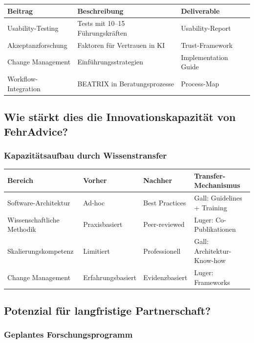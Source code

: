 \documentclass[11pt,a4paper]{article}
\begin{document}
\begin{table}[h]
\centering
\begin{tabularx}{\textwidth}{lXl}
\toprule
\textbf{Beitrag} & \textbf{Beschreibung} & \textbf{Deliverable} \\
\midrule
Usability-Testing & Tests mit 10--15 Führungskräften & Usability-Report \\
Akzeptanzforschung & Faktoren für Vertrauen in KI & Trust-Framework \\
Change Management & Einführungsstrategien & Implementation Guide \\
Workflow-Integration & BEATRIX in Beratungsprozesse & Process-Map \\
\bottomrule
\end{tabularx}
\end{table}

\subsection{Wie stärkt dies die Innovationskapazität von FehrAdvice?}

\subsubsection{Kapazitätsaufbau durch Wissenstransfer}

\begin{table}[h]
\centering
\begin{tabularx}{\textwidth}{lllX}
\toprule
\textbf{Bereich} & \textbf{Vorher} & \textbf{Nachher} & \textbf{Transfer-Mechanismus} \\
\midrule
Software-Architektur & Ad-hoc & Best Practices & Gall: Guidelines + Training \\
Wissenschaftliche Methodik & Praxisbasiert & Peer-reviewed & Luger: Co-Publikationen \\
Skalierungskompetenz & Limitiert & Professionell & Gall: Architektur-Know-how \\
Change Management & Erfahrungsbasiert & Evidenzbasiert & Luger: Frameworks \\
\bottomrule
\end{tabularx}
\end{table}

\subsection{Potenzial für langfristige Partnerschaft?}

\subsubsection{Geplantes Forschungsprogramm}
\end{document}
